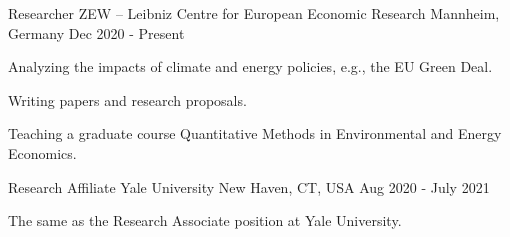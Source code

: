 

\begin{cventries}

    \cventry
    {Researcher} %
    {ZEW -- Leibniz Centre for European Economic Research} %
    {Mannheim, Germany} %
    {Dec 2020 - Present} %
    {
        \begin{cvitems} %
            \item {Analyzing the impacts of climate and energy policies, e.g., the EU Green Deal.}
            \item {Writing papers and research proposals.}
            \item {Teaching a graduate course Quantitative Methods in Environmental and Energy Economics.}
        \end{cvitems}
    }

    \cventry
    {Research Affiliate} %
    {Yale University} %
    {New Haven, CT, USA} %
    {Aug 2020 - July 2021} %
    {
        \begin{cvitems} %
            \item {The same as the Research Associate position at Yale University.}
        \end{cvitems}
    }


\end{cventries}
